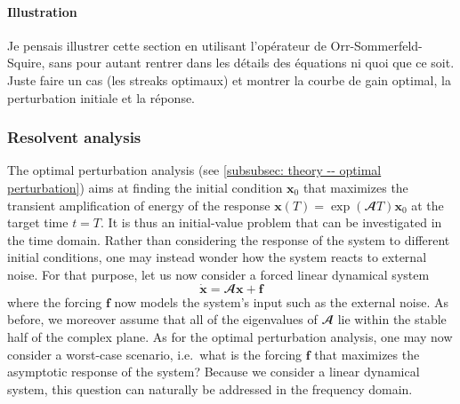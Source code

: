       \paragraph{Illustration}

      {\color{red} Je pensais illustrer cette section en utilisant l'opérateur de Orr-Sommerfeld-Squire, sans pour autant rentrer dans les d\'etails des \'equations ni quoi que ce soit. Juste faire un cas (les streaks optimaux) et montrer la courbe de gain optimal, la perturbation initiale et la r\'eponse.}

    \subsubsection{Resolvent analysis}
    \label{subsubsec: theory -- resolvent perturbation}

    The optimal perturbation analysis (see \textsection \ref{subsubsec: theory -- optimal perturbation}) aims at finding the initial condition $\mathbf{x}_0$ that maximizes the transient amplification of energy of the response $\mathbf{x}(T) = \exp \left( \mathbfcal{A} T \right) \mathbf{x}_0$ at the target time $t=T$. It is thus an initial-value problem that can be investigated in the time domain. Rather than considering the response of the system to different initial conditions, one may instead wonder how the system reacts to external noise. For that purpose, let us now consider a forced linear dynamical system
    \begin{equation}
      \dot{\mathbf{x}} = \mathbfcal{A} \mathbf{x} + \mathbf{f}
      \label{eq: theory -- forced linear system}
    \end{equation}
    where the forcing $\mathbf{f}$ now models the system's input such as the external noise. As before, we moreover assume that all of the eigenvalues of $\mathbfcal{A}$ lie within the stable half of the complex plane. As for the optimal perturbation analysis, one may now consider a worst-case scenario, i.e.\ what is the forcing $\mathbf{f}$ that maximizes the asymptotic response of the system? Because we consider a linear dynamical system, this question can naturally be addressed in the frequency domain.


